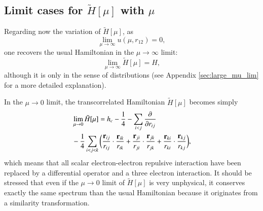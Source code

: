 \documentclass[aip,jcp,reprint,noshowkeys,superscriptaddress]{revtex4-1}
\newcommand{\deriv}[3]{\frac{\partial^{#3} #1}{\partial {#2}^{#3}}}
\newcommand{\bri}[1]{{\bf r}_{#1}}
\begin{document}
\subsection{Limit cases for $\tilde{H}[\mu]$ with $\mu$}
\label{sec:h_mu_lim}
Regarding now the variation of $\tilde{H}[\mu]$, as 
\begin{equation}
 \label{eq:lim_mu_0}
 \lim_{\mu  \rightarrow \infty }u(\mu,r_{12}) = 0, 
\end{equation}
one recovers the usual Hamiltonian in the ${\mu  \rightarrow \infty }$ limit:
\begin{equation}
 \label{eq:lim_mu_1}
 \lim_{\mu \rightarrow \infty} \tilde{H}[\mu] = H,
\end{equation}
although it is only in the sense of distributions (see Appendix \ref{sec:large_mu_lim} for a more detailed explanation). 

In the $\mu \rightarrow 0$ limit, the transcorrelated Hamiltonian $\tilde{H}[\mu]$ becomes simply 
\begin{equation}
 \label{eq:htilde_mu_low}
 \begin{aligned}
&\lim_{\mu \rightarrow 0} \tilde{H}[\mu] = h_c - \frac{1}{4} - \sum_{i<j}\deriv{}{r_{ij}}{} \\
 & - \frac{1}{4}\sum_{i<j<k}  \bigg(\frac{\bri{ij} }{ r_{ij}} \cdot \frac{\bri{ik} }{ r_{ik}} + \frac{\bri{ji} }{ r_{ji}} \cdot \frac{\bri{jk}  }{ r_{jk}} + \frac{\bri{ki} }{ r_{ki}} \cdot  \frac{\bri{kj} }{ r_{kj}} \bigg),
 \end{aligned}
\end{equation}
which means that all scalar electron-electron repulsive interaction have been replaced by a differential operator and a three electron interaction. 
It should be stressed that even if the $\mu \rightarrow 0$ limit of $\tilde{H}[\mu]$ is very unphysical, it conserves exactly the same spectrum than the usual Hamiltonian because it originates from a similarity transformation. 

\end{document}
